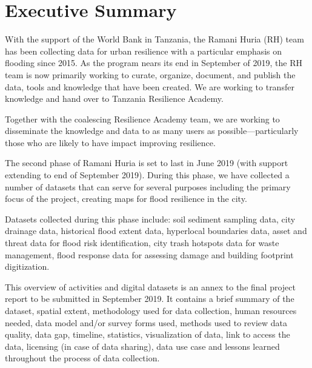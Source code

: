 \documentclass[a4paper,12pt,twoside]{article}
\begin{document}
\newpage


\renewcommand{\baselinestretch}{1.3}\normalsize
\tableofcontents
\renewcommand{\baselinestretch}{1.0}\normalsize

\newpage
\section{Executive Summary}
\label{executivesummary}
\begin{multicols}{2}

With the support of the World Bank in Tanzania, the Ramani Huria (RH) team has been collecting data for urban resilience with a particular emphasis on flooding since 2015. As the program nears its end in September of 2019, the RH team is now primarily working to curate, organize, document, and publish the data, tools and knowledge that have been created. We are working to transfer knowledge and hand over to Tanzania Resilience Academy.

Together with the coalescing Resilience Academy team, we are working to disseminate the knowledge and data to as many users as possible---particularly those who are likely to have impact improving resilience.

The second phase of Ramani Huria is set to last in June 2019 (with support extending to end of September 2019). During this phase, we have collected a number of datasets that can serve for several purposes including the primary focus of the project, creating maps for flood resilience in the city. 

Datasets collected during this phase include: soil sediment sampling data, city drainage data, historical flood extent data, hyperlocal boundaries data, asset and threat data for flood risk identification, city trash hotspots data for waste management, flood response data for assessing damage and building footprint digitization.

This overview of activities and digital datasets is an annex to the final project report to be submitted in September 2019. It contains a brief summary of the dataset, spatial extent, methodology used for data collection, human resources needed, data model and/or survey forms used, methods used to review data quality, data gap, timeline, statistics, visualization of data, link to access the data, licensing (in case of data sharing), data use case and lessons learned throughout the process of data collection.


\end{multicols}
\end{document}
